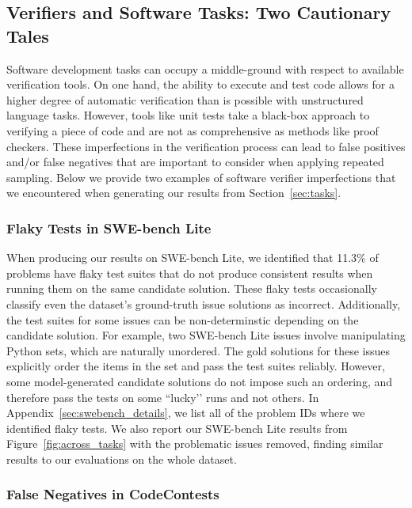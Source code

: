 \documentclass[11pt]{article}
\begin{document}
\subsection{Verifiers and Software Tasks: Two Cautionary Tales}
\label{sec:cautionary}

Software development tasks can occupy a middle-ground with respect to available verification tools.
On one hand, the ability to execute and test code allows for a higher degree of automatic verification than is possible with unstructured language tasks.
However, tools like unit tests take a black-box approach to verifying a piece of code and are not as comprehensive as methods like proof checkers.
These imperfections in the verification process can lead to false positives and/or false negatives that are important to consider when applying repeated sampling. Below we provide two examples of software verifier imperfections that we encountered when generating our results from Section~\ref{sec:tasks}.  

\subsubsection{Flaky Tests in SWE-bench Lite}

 
When producing our results on SWE-bench Lite, we identified that 11.3\% of problems have flaky test suites that do not produce consistent results when running them on the same candidate solution.
These flaky tests occasionally classify even the dataset's ground-truth issue solutions as incorrect. Additionally, the test suites for some issues can be non-determinstic depending on the candidate solution.
For example, two SWE-bench Lite issues involve manipulating Python sets, which are naturally unordered.
The gold solutions for these issues explicitly order the items in the set and pass the test suites reliably. However, some model-generated candidate solutions do not impose such an ordering, and therefore pass the tests on some ``lucky’’ runs and not others.
In Appendix~\ref{sec:swebench_details}, we list all of the problem IDs where we identified flaky tests. We also report our SWE-bench Lite results from Figure~\ref{fig:across_tasks} with the problematic issues removed, finding similar results to our evaluations on the whole dataset. 

\subsubsection{False Negatives in CodeContests}
\end{document}
